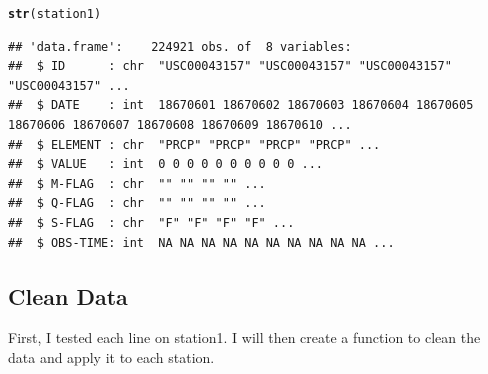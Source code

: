 \documentclass{article}\usepackage[]{graphicx}\usepackage[]{xcolor}
\makeatletter
\newcommand{\hlstd}[1]{\textcolor[rgb]{0.345,0.345,0.345}{#1}}%
\newcommand{\hlkwd}[1]{\textcolor[rgb]{0.737,0.353,0.396}{\textbf{#1}}}%
\newenvironment{kframe}{%
 \def\at@end@of@kframe{}%
 \ifinner\ifhmode%
  \def\at@end@of@kframe{\end{minipage}}%
  \begin{minipage}{\columnwidth}%
 \fi\fi%
 \def\FrameCommand##1{\hskip\@totalleftmargin \hskip-\fboxsep
 \colorbox{shadecolor}{##1}\hskip-\fboxsep
     \hskip-\linewidth \hskip-\@totalleftmargin \hskip\columnwidth}%
 \MakeFramed {\advance\hsize-\width
   \@totalleftmargin\z@ \linewidth\hsize
   \@setminipage}}%
 {\par\unskip\endMakeFramed%
 \at@end@of@kframe}
\newenvironment{knitrout}{}{} %
\makeatother
\begin{document}
\begin{knitrout}
\color{fgcolor}\begin{kframe}
\begin{alltt}
\hlkwd{str}\hlstd{(station1)}
\end{alltt}
\begin{verbatim}
## 'data.frame':	224921 obs. of  8 variables:
##  $ ID      : chr  "USC00043157" "USC00043157" "USC00043157" "USC00043157" ...
##  $ DATE    : int  18670601 18670602 18670603 18670604 18670605 18670606 18670607 18670608 18670609 18670610 ...
##  $ ELEMENT : chr  "PRCP" "PRCP" "PRCP" "PRCP" ...
##  $ VALUE   : int  0 0 0 0 0 0 0 0 0 0 ...
##  $ M-FLAG  : chr  "" "" "" "" ...
##  $ Q-FLAG  : chr  "" "" "" "" ...
##  $ S-FLAG  : chr  "F" "F" "F" "F" ...
##  $ OBS-TIME: int  NA NA NA NA NA NA NA NA NA NA ...
\end{verbatim}
\end{kframe}
\end{knitrout}


\subsection{Clean Data}

First, I tested each line on station1. I will then create a function to clean the data and apply it to each station.
\end{document}
